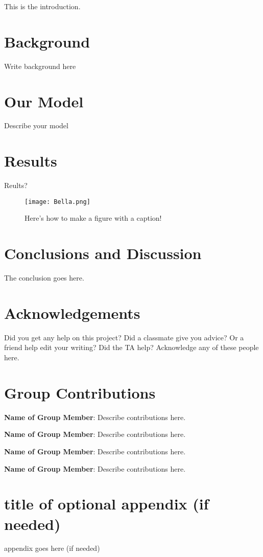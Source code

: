 \documentclass[fontsize=12pt]{amsart}
\begin{document}
This is the introduction. 
\section{Background}

Write background here

\section{Our Model}

Describe your model

\section{Results}

Reults?

\begin{figure}
    \centering
    \texttt{[image: Bella.png]} %
    \caption{Here's how to make a figure with a caption!}
    \label{fig:Bella}
\end{figure}

\section{Conclusions and Discussion}
The conclusion goes here.






\section*{Acknowledgements}

Did you get any help on this project? Did a classmate give you advice? Or a friend help edit your writing? Did the TA help? Acknowledge any of these people here.

 
\appendix
\section{Group Contributions}


\textbf{Name of Group Member}: Describe contributions here.

\textbf{Name of Group Member}: Describe contributions here.

\textbf{Name of Group Member}: Describe contributions here.

\textbf{Name of Group Member}: Describe contributions here.


\section{title of optional appendix (if needed)}
appendix goes here (if needed)
\end{document}
